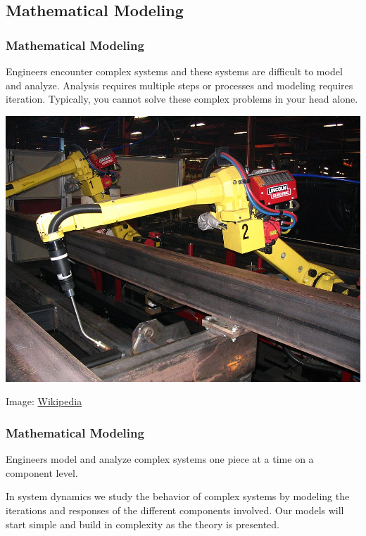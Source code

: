 \documentclass[fleqn]{beamer} %
\newcommand{\sectionIIIsubsectionItitle}{Mathematical Modeling}
\begin{document}
		\subsection{\sectionIIIsubsectionItitle}\label{sectionIIIsubsectionI}

			\begin{frame}
				\frametitle{\sectionIIIsubsectionItitle}
				\bigskip
				\begin{multicols}{2}
				Engineers encounter complex systems and these systems are difficult to model and analyze.  Analysis requires multiple steps or processes and modeling requires iteration. Typically, you cannot solve these complex problems in your head alone. \vspc

				\includegraphics[scale=.15]{images/fanuc_robot.jpg}
				\end{multicols}
				{\tiny \hspace{60mm} Image: \href{https://en.wikipedia.org/wiki/Articulated_robot}{Wikipedia} }
		
				\btVFill
			\end{frame}

			\begin{frame}
				\frametitle{\sectionIIIsubsectionItitle}
				\bigskip
				Engineers model and analyze complex systems one piece at a time on a component level. \vspc

				In system dynamics we study the behavior of complex systems by modeling the iterations and responses of the different components involved. Our models will start simple and build in complexity as the theory is presented. 
	
				\btVFill
			\end{frame}
\end{document}
